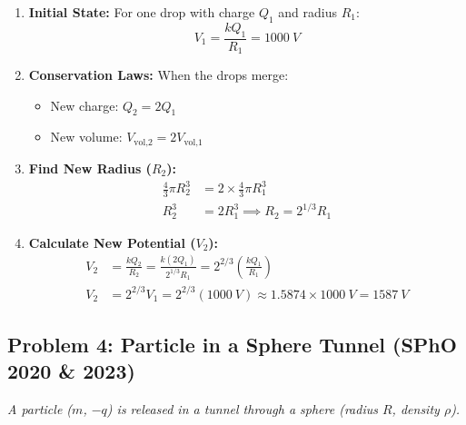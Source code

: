 \documentclass{article}
\numberwithin{equation}{section}
\begin{document}
\begin{enumerate}
    \item \textbf{Initial State:} For one drop with charge $Q_1$ and radius $R_1$:
    $$ V_1 = \frac{k Q_1}{R_1} = \SI{1000}{V} $$
    
    \item \textbf{Conservation Laws:} When the drops merge:
    \begin{itemize}
        \item New charge: $Q_2 = 2Q_1$
        \item New volume: $V_{\text{vol,2}} = 2 V_{\text{vol,1}}$
    \end{itemize}
    
    \item \textbf{Find New Radius ($R_2$):}
    \begin{align*}
        \frac{4}{3}\pi R_2^3 &= 2 \times \frac{4}{3}\pi R_1^3 \\
        R_2^3 &= 2 R_1^3 \implies R_2 = 2^{1/3} R_1
    \end{align*}

    \item \textbf{Calculate New Potential ($V_2$):}
    \begin{align*}
        V_2 &= \frac{k Q_2}{R_2} = \frac{k(2Q_1)}{2^{1/3}R_1} = 2^{2/3} \left( \frac{kQ_1}{R_1} \right) \\
        V_2 &= 2^{2/3} V_1 = 2^{2/3} (\SI{1000}{V}) \approx \num{1.5874} \times \SI{1000}{V} = \SI{1587}{V}
    \end{align*}
\end{enumerate}

\hrulefill
\subsection{Problem 4: Particle in a Sphere Tunnel (SPhO 2020 \& 2023)}
\textit{A particle ($m$, $-q$) is released in a tunnel through a sphere (radius $R$, density $\rho$).}
\end{document}

